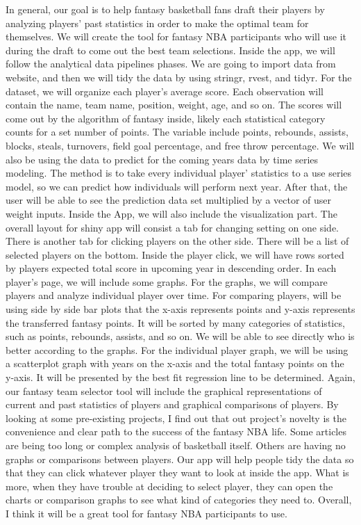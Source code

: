 \documentclass[]{article}
\begin{document}
In general, our goal is to help fantasy basketball fans draft their
players by analyzing players' past statistics in order to make the
optimal team for themselves. We will create the tool for fantasy NBA
participants who will use it during the draft to come out the best team
selections. Inside the app, we will follow the analytical data pipelines
phases. We are going to import data from website, and then we will tidy
the data by using stringr, rvest, and tidyr. For the dataset, we will
organize each player's average score. Each observation will contain the
name, team name, position, weight, age, and so on. The scores will come
out by the algorithm of fantasy inside, likely each statistical category
counts for a set number of points. The variable include points,
rebounds, assists, blocks, steals, turnovers, field goal percentage, and
free throw percentage. We will also be using the data to predict for the
coming years data by time series modeling. The method is to take every
individual player' statistics to a use series model, so we can predict
how individuals will perform next year. After that, the user will be
able to see the prediction data set multiplied by a vector of user
weight inputs. Inside the App, we will also include the visualization
part. The overall layout for shiny app will consist a tab for changing
setting on one side. There is another tab for clicking players on the
other side. There will be a list of selected players on the bottom.
Inside the player click, we will have rows sorted by players expected
total score in upcoming year in descending order. In each player's page,
we will include some graphs. For the graphs, we will compare players and
analyze individual player over time. For comparing players, will be
using side by side bar plots that the x-axis represents points and
y-axis represents the transferred fantasy points. It will be sorted by
many categories of statistics, such as points, rebounds, assists, and so
on. We will be able to see directly who is better according to the
graphs. For the individual player graph, we will be using a scatterplot
graph with years on the x-axis and the total fantasy points on the
y-axis. It will be presented by the best fit regression line to be
determined. Again, our fantasy team selector tool will include the
graphical representations of current and past statistics of players and
graphical comparisons of players. By looking at some pre-existing
projects, I find out that out project's novelty is the convenience and
clear path to the success of the fantasy NBA life. Some articles are
being too long or complex analysis of basketball itself. Others are
having no graphs or comparisons between players. Our app will help
people tidy the data so that they can click whatever player they want to
look at inside the app. What is more, when they have trouble at deciding
to select player, they can open the charts or comparison graphs to see
what kind of categories they need to. Overall, I think it will be a
great tool for fantasy NBA participants to use.
\end{document}

